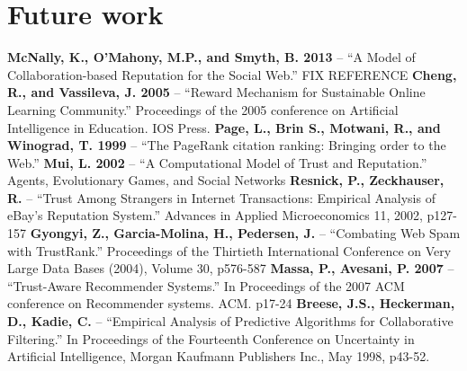 \documentclass[]{final_report}
\begin{document}
\section{Future work}



\newpage
\raggedright
\textbf{McNally, K., O'Mahony, M.P., and Smyth, B. 2013} -- ``A Model of Collaboration-based Reputation for the Social Web.'' FIX REFERENCE
\linebreak
\linebreak
\textbf{Cheng, R., and Vassileva, J. 2005} -- ``Reward Mechanism for Sustainable Online Learning Community.'' Proceedings of the 2005 conference on Artificial Intelligence in Education. IOS Press.
\linebreak
\linebreak
\textbf{Page, L., Brin S., Motwani, R., and Winograd, T. 1999} -- ``The PageRank citation ranking: Bringing order to the Web.''
\linebreak
\linebreak
\textbf{Mui, L. 2002} -- ``A Computational Model of Trust and Reputation.'' Agents, Evolutionary Games, and Social Networks
\linebreak
\linebreak
\textbf{Resnick, P., Zeckhauser, R.} -- ``Trust Among Strangers in Internet Transactions: Empirical Analysis of eBay's Reputation System.'' Advances in Applied Microeconomics 11, 2002, p127-157
\linebreak
\linebreak
\textbf{Gyongyi, Z., Garcia-Molina, H., Pedersen, J.} -- ``Combating Web Spam with TrustRank.'' Proceedings of the Thirtieth International Conference on Very Large Data Bases (2004), Volume 30, p576-587
\linebreak
\linebreak
\textbf{Massa, P., Avesani, P. 2007} -- ``Trust-Aware Recommender Systems.'' In Proceedings of the 2007 ACM conference on Recommender systems. ACM. p17-24
\linebreak
\linebreak
\textbf{Breese, J.S., Heckerman, D., Kadie, C.} -- ``Empirical Analysis of Predictive Algorithms for Collaborative Filtering.'' In Proceedings of the Fourteenth Conference on Uncertainty in Artificial Intelligence, Morgan Kaufmann Publishers Inc., May 1998, p43-52.
\end{document}
